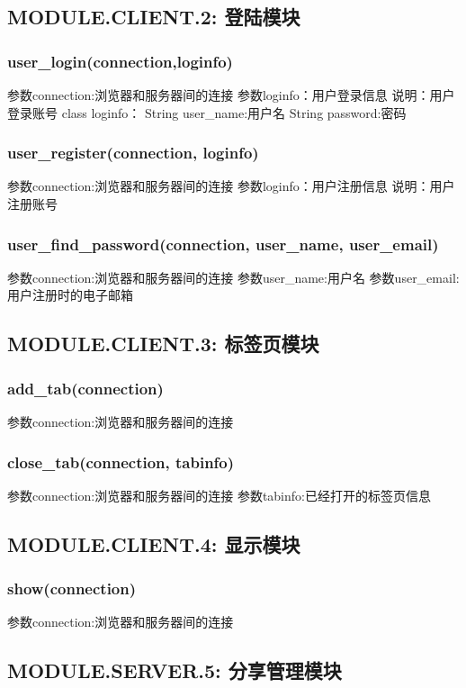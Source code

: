 \subsection{MODULE.CLIENT.2: 登陆模块}

\subsubsection{user_login(connection,loginfo)}
参数connection:浏览器和服务器间的连接
参数loginfo：用户登录信息
说明：用户登录账号
class loginfo：
String user_name:用户名
String password:密码
\subsubsection{user_register(connection, loginfo)}
参数connection:浏览器和服务器间的连接
参数loginfo：用户注册信息
说明：用户注册账号
\subsubsection{user_find_password(connection, user_name, user_email)}
参数connection:浏览器和服务器间的连接
参数user_name:用户名
参数user_email:用户注册时的电子邮箱

\subsection{MODULE.CLIENT.3: 标签页模块}

\subsubsection{add_tab(connection)}
参数connection:浏览器和服务器间的连接
\subsubsection{close_tab(connection, tabinfo)}
参数connection:浏览器和服务器间的连接
参数tabinfo:已经打开的标签页信息

\subsection{MODULE.CLIENT.4: 显示模块}
\subsubsection{show(connection)}
参数connection:浏览器和服务器间的连接

\subsection{MODULE.SERVER.5: 分享管理模块}
